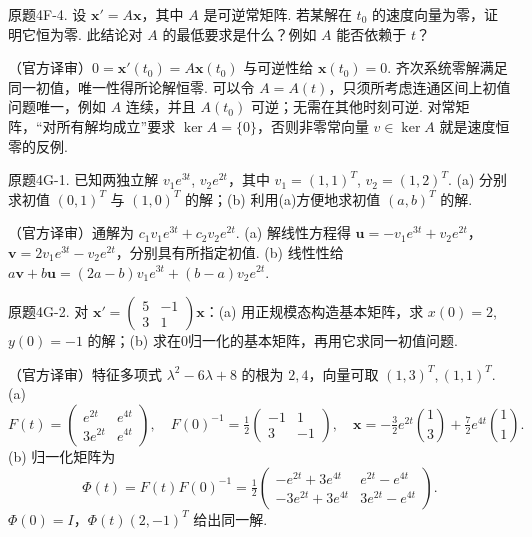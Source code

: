 \begin{exercise}\label{cw:bank-4F-4}原题4F-4. 设 $\mathbf x'=A\mathbf x$，其中 $A$ 是可逆常矩阵. 若某解在 $t_0$ 的速度向量为零，证明它恒为零. 此结论对 $A$ 的最低要求是什么？例如 $A$ 能否依赖于 $t$？\end{exercise}
\begin{solution}（官方译审）$0=\mathbf x'(t_0)=A\mathbf x(t_0)$ 与可逆性给 $\mathbf x(t_0)=0$. 齐次系统零解满足同一初值，唯一性得所论解恒零. 可以令 $A=A(t)$，只须所考虑连通区间上初值问题唯一，例如 $A$ 连续，并且 $A(t_0)$ 可逆；无需在其他时刻可逆. 对常矩阵，“对所有解均成立”要求 $\ker A=\{0\}$，否则非零常向量 $v\in\ker A$ 就是速度恒零的反例.\end{solution}
\begin{exercise}\label{cw:bank-4G-1}原题4G-1. 已知两独立解 $v_1e^{3t}$, $v_2e^{2t}$，其中 $v_1=(1,1)^T$, $v_2=(1,2)^T$. (a) 分别求初值 $(0,1)^T$ 与 $(1,0)^T$ 的解；(b) 利用(a)方便地求初值 $(a,b)^T$ 的解.\end{exercise}
\begin{solution}（官方译审）通解为 $c_1v_1e^{3t}+c_2v_2e^{2t}$. (a) 解线性方程得 $\mathbf u=-v_1e^{3t}+v_2e^{2t}$，$\mathbf v=2v_1e^{3t}-v_2e^{2t}$，分别具有所指定初值. (b) 线性性给 $a\mathbf v+b\mathbf u=(2a-b)v_1e^{3t}+(b-a)v_2e^{2t}$.\end{solution}
\begin{exercise}\label{cw:bank-4G-2}原题4G-2. 对 $\mathbf x'=\begin{pmatrix}5&-1\\3&1\end{pmatrix}\mathbf x$：(a) 用正规模态构造基本矩阵，求 $x(0)=2$, $y(0)=-1$ 的解；(b) 求在0归一化的基本矩阵，再用它求同一初值问题.\end{exercise}
\begin{solution}（官方译审）特征多项式 $\lambda^2-6\lambda+8$ 的根为 $2,4$，向量可取 $(1,3)^T,(1,1)^T$. (a)
\[F(t)=\begin{pmatrix}e^{2t}&e^{4t}\\3e^{2t}&e^{4t}\end{pmatrix},\quad
F(0)^{-1}=\tfrac12\begin{pmatrix}-1&1\\3&-1\end{pmatrix},\quad
\mathbf x=-\tfrac32e^{2t}\binom13+\tfrac72e^{4t}\binom11.\]
(b) 归一化矩阵为
\[\Phi(t)=F(t)F(0)^{-1}=\tfrac12\begin{pmatrix}-e^{2t}+3e^{4t}&e^{2t}-e^{4t}\\-3e^{2t}+3e^{4t}&3e^{2t}-e^{4t}\end{pmatrix}.\]
$\Phi(0)=I$，$\Phi(t)(2,-1)^T$ 给出同一解.\end{solution}

